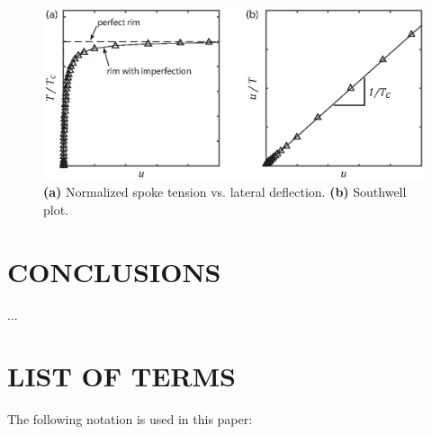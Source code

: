 \documentclass{bmd2016p}
\begin{document}
\begin{figure}[!ht]
\centering
\includegraphics[scale=1.0]{figures/bmd_figures-07.eps}
\caption{\textbf{(a)} Normalized spoke tension vs. lateral deflection. \textbf{(b)} Southwell plot.}
\label{fig:Southwell}
\end{figure}

\section{CONCLUSIONS}
...






\newpage
\section*{LIST OF TERMS}
The following notation is used in this paper:
\end{document}
